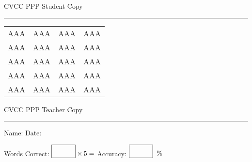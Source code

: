 \documentclass{memoir}
\begin{document}

\footnotesize \noindent
CVCC PPP \hfill Student Copy
\smallskip
\hrule

\Large

\setlength{\tabcolsep}{14pt}
\def\arraystretch{3}

{\selectfont


\begin{vplace}[0.5]
\begin{center}
\begin{tabular}{cccc}
AAA & AAA & AAA & AAA \\
AAA & AAA & AAA & AAA \\
AAA & AAA & AAA & AAA \\
AAA & AAA & AAA & AAA \\
AAA & AAA & AAA & AAA \\
\end{tabular}
\end{center}
\end{vplace}

}

\newpage

\footnotesize \noindent
CVCC PPP \hfill Teacher Copy
\smallskip
\hrule

\small

\vfill

\noindent
Name: \underline{\hspace{1.75in}} \hfill Date: \underline{\hspace{1in}}

\Large

{\selectfont



}

\small

Words Correct: $\fbox{\phantom{\huge 100}} \times 5 = $ Accuracy: $\fbox{\phantom{\huge 100}}\;\; \%$ 

\vfill

\end{document}
